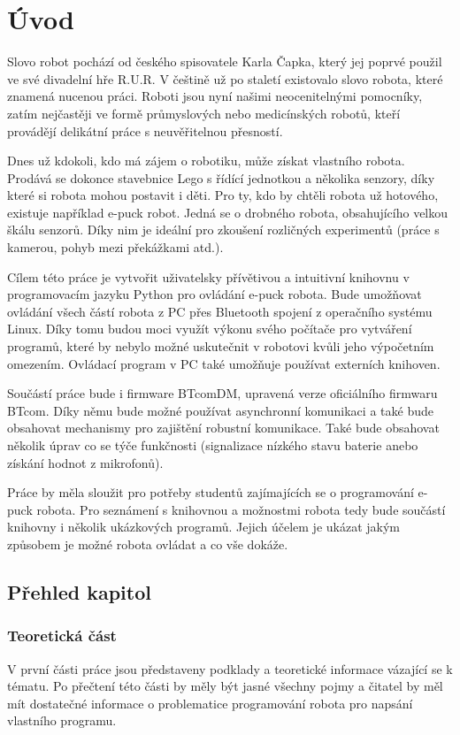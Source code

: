 \chapter*{Úvod}

Slovo robot pochází od českého spisovatele Karla Čapka, který jej poprvé
použil ve své divadelní hře R.U.R. V češtině už po staletí existovalo slovo
robota, které znamená nucenou práci. Roboti jsou nyní našimi neocenitelnými
pomocníky, zatím nejčastěji ve formě průmyslových nebo medicínských robotů,
kteří provádějí delikátní práce s neuvěřitelnou přesností.

Dnes už kdokoli, kdo má zájem o robotiku, může získat vlastního robota.
Prodává se dokonce stavebnice Lego s řídící jednotkou a několika senzory,
díky které si robota mohou postavit i děti. Pro ty, kdo by chtěli robota už
hotového, existuje například e-puck \cite{epuck} robot. Jedná se o drobného
robota, obsahujícího velkou škálu senzorů. Díky nim je ideální pro zkoušení
rozličných experimentů (práce s kamerou, pohyb mezi překážkami atd.).

Cílem této práce je vytvořit uživatelsky přívětivou a intuitivní knihovnu v
programovacím jazyku Python pro ovládání e-puck robota. Bude umožňovat ovládání
všech částí robota z PC přes Bluetooth spojení z operačního systému Linux. Díky
tomu budou moci využít výkonu svého počítače pro vytváření programů, které by
nebylo možné uskutečnit v robotovi kvůli jeho výpočetním omezením. Ovládací
program v PC také umožňuje používat externích knihoven.

Součástí práce bude i firmware BTcomDM, upravená verze oficiálního firmwaru
BTcom. Díky němu bude možné používat asynchronní komunikaci a také bude
obsahovat mechanismy pro zajištění robustní komunikace. Také bude obsahovat
několik úprav co se týče funkčnosti (signalizace nízkého stavu baterie anebo
získání hodnot z mikrofonů).

Práce by měla sloužit pro potřeby studentů zajímajících se o programování
e-puck robota. Pro seznámení s knihovnou a možnostmi robota tedy bude součástí
knihovny i několik ukázkových programů. Jejich účelem je ukázat jakým způsobem
je možné robota ovládat a co vše dokáže.

\section*{Přehled kapitol}

\subsection*{Teoretická část}
V první části práce jsou představeny podklady a teoretické informace
vázající se k tématu. Po přečtení této části by měly být jasné všechny
pojmy a čitatel by měl mít dostatečné informace o problematice programování
robota pro napsání vlastního programu.

